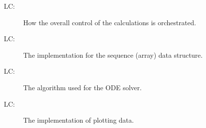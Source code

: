 \documentclass[12pt]{article}
\newcounter{lcnum}
\newcommand{\lcthelcnum}{LC\thelcnum}
\begin{document}
\begin{description}
\item[\lcthelcnum\label{LC:control}:]How the overall control of the calculations is orchestrated.
\end{description}
\begin{description}
\item[\lcthelcnum\label{LC:array}:]The implementation for the sequence (array) data structure.
\end{description}
\begin{description}
\item[\lcthelcnum\label{LC:ode}:]The algorithm used for the ODE solver.
\end{description}
\begin{description}
\item[\lcthelcnum\label{LC:plot}:]The implementation of plotting data.
\end{description}
\end{document}

